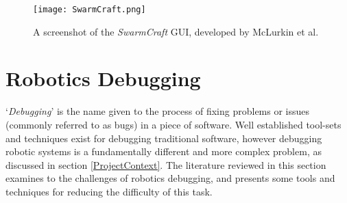 \begin{figure}
 \begin{center}
 \texttt{[image: SwarmCraft.png]}
 \decoRule
 \caption[Swarm Craft GUI. \cite{McLurkin:2006}]{A screenshot of the \textit{SwarmCraft} GUI, developed by McLurkin et al. \cite{McLurkin:2006}}
 \label{fig:SwarmCraft}
 \end{center}
\end{figure}


\section{Robotics Debugging} \label{RoboticsDebugging}
`\textit{Debugging}' is the name given to the process of fixing problems or issues (commonly referred to as bugs) in a piece of software. Well established tool-sets and techniques exist for debugging traditional software, however debugging robotic systems is a fundamentally different and more complex problem, as discussed in section \ref{ProjectContext}. The literature reviewed in this section examines to the challenges of robotics debugging, and presents some tools and techniques for reducing the difficulty of this task.


